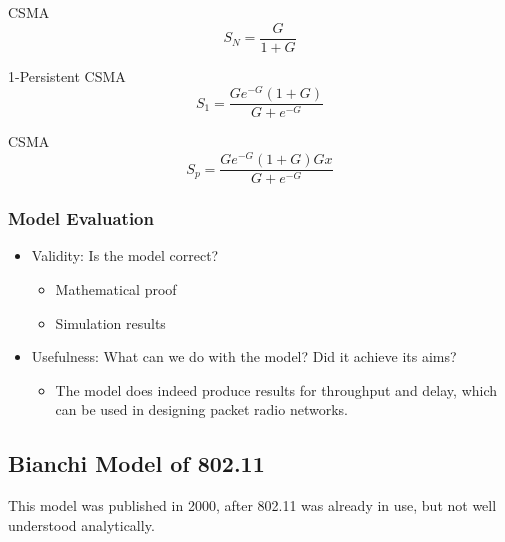  CSMA
\begin{equation}\label{eq:Non_Persistent_CSMA_Throughput}
  S_{N} = \frac{G}{1+G}
\end{equation}

1-Persistent CSMA
\begin{equation}\label{eq:1_Persistent_CSMA_Throughput}
  S_{1} = \frac{G e^{-G} (1+G)}{G + e^{-G}}
\end{equation}

 CSMA
\begin{equation}\label{eq:p_Persistent_CSMA_Throughput}
  S_{p} = \frac{G e^{-G} (1+G) Gx}{G+e^{-G}}
\end{equation}

\subsubsection{Model Evaluation}\label{subsubsec:Kleinrock_Tobagi_Model_Eval}
\begin{itemize}[noitemsep]
\item Validity: Is the model correct?
  \begin{itemize}[noitemsep]
  \item Mathematical proof
  \item Simulation results
  \end{itemize}

\item Usefulness: What can we do with the model? Did it achieve
  its aims?
  \begin{itemize}[noitemsep]
  \item The model does indeed produce results for throughput and delay, which can be used in designing packet radio networks.
  \end{itemize}
\end{itemize}

\subsection{Bianchi Model of 802.11}\label{subsec:Bianchi_Model}
This model was published in 2000, after 802.11 was already in use, but not well understood analytically.

